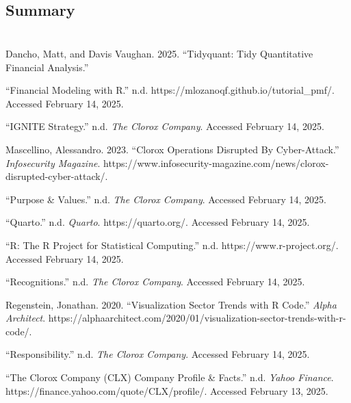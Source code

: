 \documentclass[
  letterpaper,
  DIV=11,
  numbers=noendperiod]{scrartcl}
\newlength{\cslhangindent}
\newenvironment{CSLReferences}[2] %
 {\begin{list}{}{%
  \setlength{\itemindent}{0pt}
  \setlength{\leftmargin}{0pt}
  \setlength{\parsep}{0pt}
  \ifodd #1
   \setlength{\leftmargin}{\cslhangindent}
   \setlength{\itemindent}{-1\cslhangindent}
  \fi
  \setlength{\itemsep}{#2\baselineskip}}}
 {\end{list}}
\begin{document}
\subsection{Summary}\label{summary-1}

\section{}\label{section-7}

\label{refs}
\begin{CSLReferences}{1}{0}
Dancho, Matt, and Davis Vaughan. 2025. {``Tidyquant: {Tidy Quantitative
Financial Analysis}.''}

{``Financial Modeling with {R}.''} n.d.
https://mlozanoqf.github.io/tutorial\_pmf/. Accessed February 14, 2025.

{``{IGNITE Strategy}.''} n.d. \emph{The Clorox Company}. Accessed
February 14, 2025.

Mascellino, Alessandro. 2023. {``Clorox {Operations Disrupted By
Cyber-Attack}.''} \emph{Infosecurity Magazine}.
https://www.infosecurity-magazine.com/news/clorox-disrupted-cyber-attack/.

{``Purpose \& {Values}.''} n.d. \emph{The Clorox Company}. Accessed
February 14, 2025.

{``Quarto.''} n.d. \emph{Quarto}. https://quarto.org/. Accessed February
14, 2025.

{``R: {The R Project} for {Statistical Computing}.''} n.d.
https://www.r-project.org/. Accessed February 14, 2025.

{``Recognitions.''} n.d. \emph{The Clorox Company}. Accessed February
14, 2025.

Regenstein, Jonathan. 2020. {``Visualization {Sector Trends} with {R
Code}.''} \emph{Alpha Architect}.
https://alphaarchitect.com/2020/01/visualization-sector-trends-with-r-code/.

{``Responsibility.''} n.d. \emph{The Clorox Company}. Accessed February
14, 2025.

{``The {Clorox Company} ({CLX}) {Company Profile} \& {Facts}.''} n.d.
\emph{Yahoo Finance}. https://finance.yahoo.com/quote/CLX/profile/.
Accessed February 13, 2025.


\end{CSLReferences}
\end{document}
